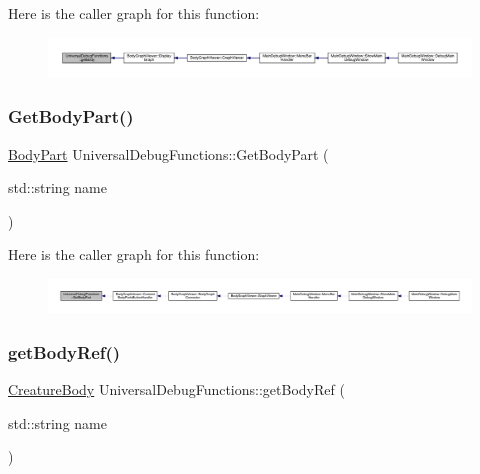 Here is the caller graph for this function\+:
\nopagebreak
\begin{figure}[H]
\begin{center}
\leavevmode
\includegraphics[width=350pt]{d4/d16/namespace_universal_debug_functions_a25b85b8c4e031a0e076f679acc405af8_icgraph}
\end{center}
\end{figure}
\mbox{\label{namespace_universal_debug_functions_a6b25dc6d07d7ecd36501c946195b403d}} 
\subsubsection{\texorpdfstring{Get\+Body\+Part()}{GetBodyPart()}}
{\footnotesize\ttfamily \mbox{\hyperlink{class_body_part}{Body\+Part}} Universal\+Debug\+Functions\+::\+Get\+Body\+Part (\begin{DoxyParamCaption}\item[{std\+::string}]{name }\end{DoxyParamCaption})}

Here is the caller graph for this function\+:
\nopagebreak
\begin{figure}[H]
\begin{center}
\leavevmode
\includegraphics[width=350pt]{d4/d16/namespace_universal_debug_functions_a6b25dc6d07d7ecd36501c946195b403d_icgraph}
\end{center}
\end{figure}
\mbox{\label{namespace_universal_debug_functions_a08ac83c95afab4a5d9828f0efd3b8249}} 
\subsubsection{\texorpdfstring{get\+Body\+Ref()}{getBodyRef()}}
{\footnotesize\ttfamily \mbox{\hyperlink{class_creature_body}{Creature\+Body}} Universal\+Debug\+Functions\+::get\+Body\+Ref (\begin{DoxyParamCaption}\item[{std\+::string}]{name }\end{DoxyParamCaption})}

